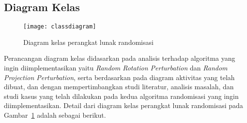 \subsection{Diagram Kelas}
\label{subsec:diagram-kelas}

\begin{figure}
    \centering
    \texttt{[image: classdiagram]}
    \caption{Diagram kelas perangkat lunak randomisasi}
    \label{fig:classdiagram}
\end{figure}

Perancangan diagram kelas didasarkan pada analisis terhadap algoritma yang ingin diimplementasikan yaitu \textit{Random Rotation Perturbation} dan \textit{Random Projection Perturbation}, serta berdasarkan pada diagram aktivitas yang telah dibuat, dan dengan mempertimbangkan studi literatur, analisis masalah, dan studi kasus yang telah dilakukan pada kedua algoritma randomisasi yang ingin diimplementasikan. Detail dari diagram kelas perangkat lunak randomisasi pada Gambar~\ref{fig:classdiagram} adalah sebagai berikut.
